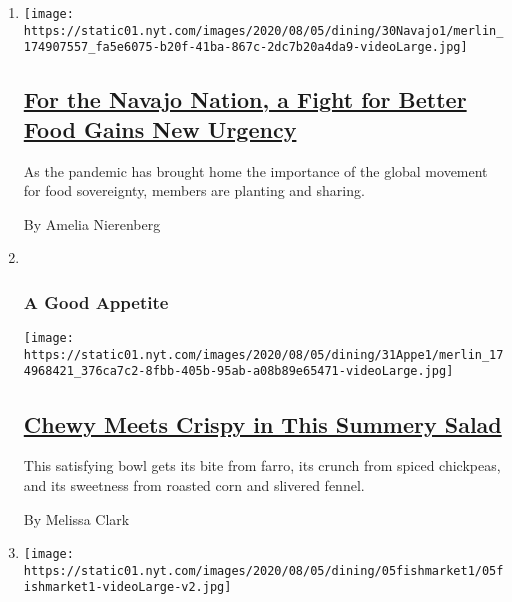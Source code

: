 \begin{enumerate}
\def\labelenumi{\arabic{enumi}.}
\item
  \texttt{[image: https://static01.nyt.com/images/2020/08/05/dining/30Navajo1/merlin\_174907557\_fa5e6075-b20f-41ba-867c-2dc7b20a4da9-videoLarge.jpg]}

  \hypertarget{for-the-navajo-nation-a-fight-for-better-food-gains-new-urgency}{%
  \subsection{\texorpdfstring{\href{/2020/08/03/dining/navajo-nation-food-coronavirus.html}{For
  the Navajo Nation, a Fight for Better Food Gains New
  Urgency}}{For the Navajo Nation, a Fight for Better Food Gains New Urgency}}\label{for-the-navajo-nation-a-fight-for-better-food-gains-new-urgency}}

  As the pandemic has brought home the importance of the global movement
  for food sovereignty, members are planting and sharing.

  By Amelia Nierenberg
\item ~
  \hypertarget{a-good-appetite-1}{%
  \subsubsection{A Good Appetite}\label{a-good-appetite-1}}

  \texttt{[image: https://static01.nyt.com/images/2020/08/05/dining/31Appe1/merlin\_174968421\_376ca7c2-8fbb-405b-95ab-a08b89e65471-videoLarge.jpg]}

  \hypertarget{chewy-meets-crispy-in-this-summery-salad}{%
  \subsection{\texorpdfstring{\href{/2020/07/31/dining/farro-corn-chickpea-salad-recipe.html}{Chewy
  Meets Crispy in This Summery
  Salad}}{Chewy Meets Crispy in This Summery Salad}}\label{chewy-meets-crispy-in-this-summery-salad}}

  This satisfying bowl gets its bite from farro, its crunch from spiced
  chickpeas, and its sweetness from roasted corn and slivered fennel.

  By Melissa Clark
\item
  \texttt{[image: https://static01.nyt.com/images/2020/08/05/dining/05fishmarket1/05fishmarket1-videoLarge-v2.jpg]}

  \hypertarget{a-harlem-restaurant-thats-withstood-gentrification-a-pandemic-and-time}{%
}
\end{enumerate}
